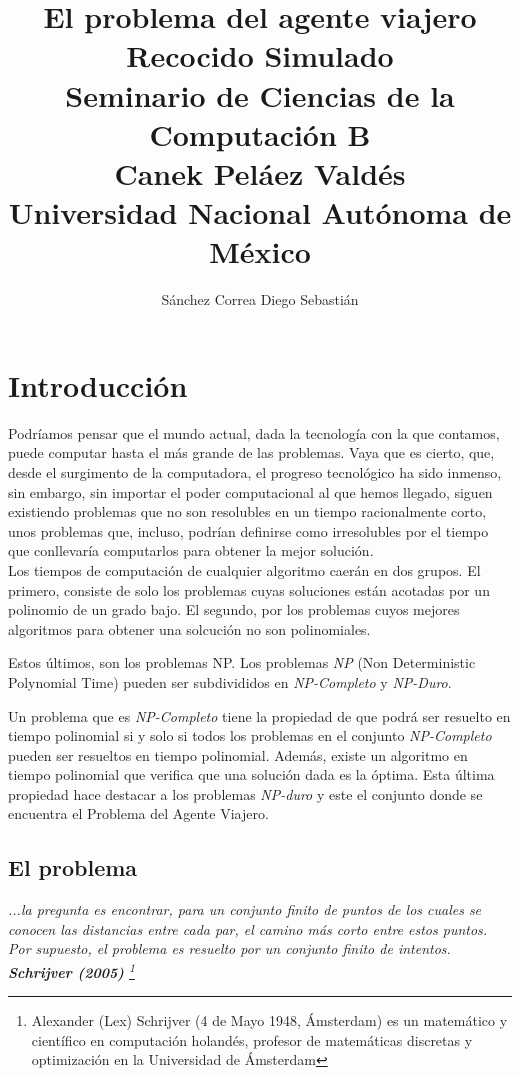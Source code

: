 \documentclass[a4paper]{report}
\title {\textbf {\Large{El problema del agente viajero}}\protect\\
  \large{\textbf{Recocido Simulado}}\protect\\ \vspace{0.4cm}
  \normalsize{\textbf{Seminario de Ciencias de la Computaci\'on B}} \protect\\ \vspace{0.2cm}
  \normalsize{Canek Pel\'aez Vald\'es} \protect\\ \vspace{0.4cm}
  \normalsize{Universidad Nacional Aut\'onoma de M\'exico}}
\date{}
\author{\normalsize Sánchez Correa Diego Sebastián}
\begin{document}
\allowdisplaybreaks
\maketitle
\tableofcontents

\chapter{Introducci\'on}
Podr\'iamos pensar que el mundo actual, dada la tecnolog\'ia con la que contamos,
puede computar hasta el m\'as grande de las problemas. Vaya que es
cierto, que, desde el surgimento de la computadora, el progreso tecnol\'ogico ha sido inmenso,
sin embargo, sin importar el poder computacional al que hemos llegado, siguen existiendo
problemas que no son resolubles en un tiempo racionalmente corto, unos problemas que, incluso,
podr\'ian definirse como irresolubles por el tiempo que conllevar\'ia computarlos para obtener
la mejor soluci\'on.\\

Los tiempos de computaci\'on de cualquier algoritmo caer\'an en dos grupos.
El primero, consiste de solo los problemas cuyas soluciones est\'an acotadas por un polinomio
de un grado bajo. El segundo, por los problemas cuyos mejores algoritmos para obtener una
solcuci\'on no son polinomiales.

Estos \'ultimos, son los problemas NP. Los problemas \textit{NP} (Non Deterministic Polynomial Time)
pueden ser subdivididos en \textit{NP-Completo} y \textit{NP-Duro}.

Un problema que es \textit{NP-Completo} tiene la propiedad de que podr\'a ser resuelto en tiempo
polinomial si y solo si todos los problemas en el conjunto \textit{NP-Completo} pueden ser
resueltos en tiempo polinomial. Adem\'as, existe un algoritmo en tiempo polinomial que verifica que
una soluci\'on dada es la \'optima. Esta \'ultima propiedad hace destacar a los problemas \textit{NP-duro} y este
el conjunto donde se encuentra el Problema del Agente Viajero.
\clearpage
\section{El problema}

\begin{center}
  \textit{...la pregunta es encontrar, para un conjunto finito de puntos de los
    cuales se conocen las distancias entre cada par, el camino más corto entre
    estos puntos. Por supuesto, el problema es resuelto por un conjunto finito
    de intentos. \textbf{Schrijver (2005)}
    \footnote{Alexander (Lex) Schrijver (4 de Mayo 1948, \'Amsterdam) es
      un matem\'atico y cient\'ifico en computaci\'on holand\'es,
      profesor de matem\'aticas discretas y optimizaci\'on
      en la Universidad de \'Amsterdam}}
\end{center}
\end{document}
